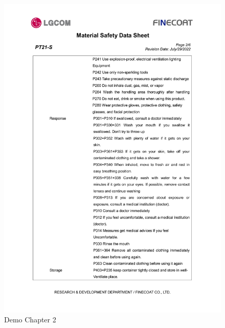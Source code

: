 \documentclass[a4paper,12pt,twoside]{report}
\begin{document}
\begin{figure}[H]
		\includegraphics[width=\textwidth, keepaspectratio]{images/chaps2}
	\caption[chaps123]{Demo Chapter 2}
\label{chaps2}
\end{figure}
\end{document}
